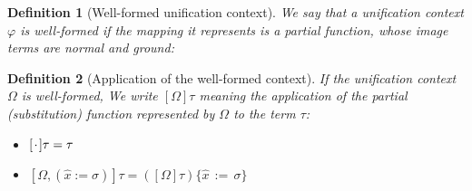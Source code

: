 \documentclass[a4,natbib=false]{article}
\newtheorem{definition}{Definition}
\newcommand{\subst}[3]{{#1}\{{#2}\,:=\,{#3}\}}
\newcommand{\ctxtapp}[2]{[{#1}] {#2}}
\newcommand{\evarassign}[2]{({#1} \mathsf{:=} {#2})}
\newcommand{\spcdot}{\mkern 2mu\cdot\mkern 2mu}
\newcommand{\emptyctx}{\spcdot}
\newcommand{\narg}[1]{|{#1}|}
\newcommand{\judgectx}[2]{{#1} \vdash {#2}}
\newcommand{\judgeSnf}[1]{{#1}\,\mathsf{NF}}
\newcommand{\judgeinst}[2]{{#1} \vdash {#2}}
\newcommand{\fullterm}[2]{{#1}\,#2_1 \dots #2_{\narg{#1}}}
\newcommand{\Infer}[3]{\inferrule*[right={#1}]{#2}{#3}}
\begin{document}


\begin{definition}[Well-formed unification context]
  We say that a unification context $\varphi$ is well-formed if the mapping it
  represents is a partial function, whose image terms are normal and ground:
\end{definition}

\begin{definition}[Application of the well-formed context]
  If the unification context $\Omega$ is well-formed,
  We write $\ctxtapp{\Omega}{\tau}$ meaning the application of the partial
  (substitution) function represented by $\Omega$ to the term $\tau$:
  \begin{itemize}
  \item $\ctxtapp{\emptyctx}{\tau} = \tau$
  \item $\ctxtapp{\Omega, \evarassign{\hat{x}}{\sigma}}{\tau} = \subst{(\ctxtapp{\Omega}{\tau})}{\hat{x}}{\sigma}$
  \end{itemize}

\end{definition}
\end{document}
